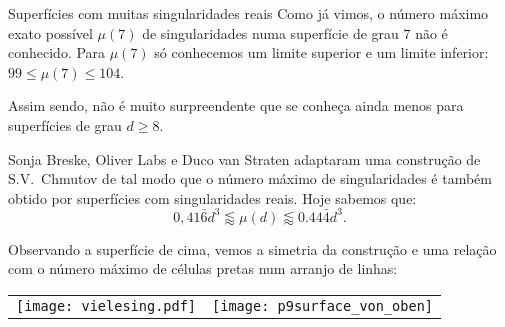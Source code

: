 \begin{surferPage}[216 Sing.]{Superf\'icies com muitas singularidades reais}
    Como j\'a vimos, o n\'umero m\'aximo  exato poss\'ivel   $\mu(7)$
de singularidades numa superf\'icie de grau $7$ 
 n\~ao \'e conhecido.
    Para  $\mu(7)$  s\'o conhecemos um limite superior e um limite  inferior: $99\le \mu(7) \le 104$. 


    Assim sendo, n\~ao \'e muito surpreendente que se conhe\c ca ainda menos para superf\'icies de grau $d \ge 8$. 

    Sonja Breske, Oliver Labs e Duco van Straten adaptaram uma constru\c c\~ao de S.V.\ Chmutov de tal modo que o n\'umero m\'aximo de singularidades \'e tamb\'em obtido por superf\'icies com singularidades reais. Hoje sabemos que:
    \[0,41\bar{6}d^3 \lessapprox \mu(d) \lessapprox 0.44\bar{4} d^3.\]

    Observando a superf\'icie de cima, vemos a simetria da constru\c c\~ao e uma rela\c c\~ao com o n\'umero m\'aximo de c\'elulas pretas num arranjo de linhas:
    \begin{center}
      \begin{tabular}{c@{\qquad}c}
        \texttt{[image: vielesing.pdf]}
        &
        \texttt{[image: p9surface\_von\_oben]}
      \end{tabular}
    \end{center}
\end{surferPage}
